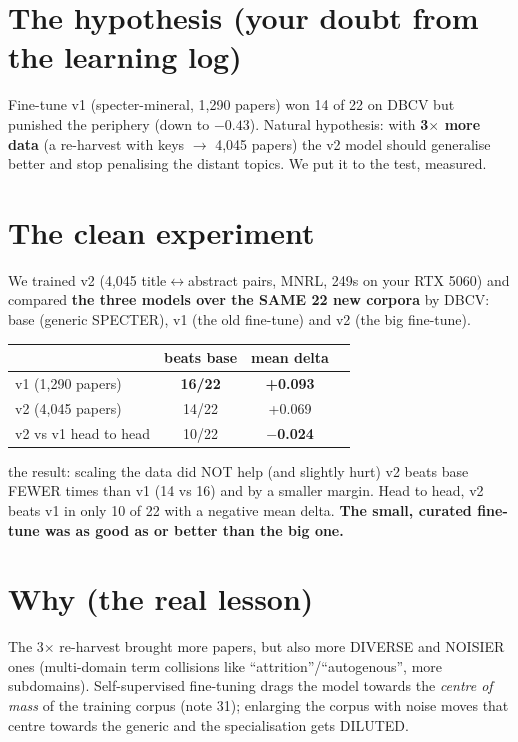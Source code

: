 \documentclass[11pt,a4paper]{article}
\begin{document}

\section{The hypothesis (your doubt from the learning log)}

Fine-tune v1 (specter-mineral, 1,290 papers) won 14 of 22 on DBCV but punished the periphery
(down to $-0.43$). Natural hypothesis: with \textbf{3$\times$ more data} (a re-harvest with
keys $\to$ 4,045 papers) the v2 model should generalise better and stop penalising the distant
topics. We put it to the test, measured.

\section{The clean experiment}

We trained v2 (4,045 title$\leftrightarrow$abstract pairs, MNRL, 249s on your RTX 5060) and
compared \textbf{the three models over the SAME 22 new corpora} by DBCV: base (generic
SPECTER), v1 (the old fine-tune) and v2 (the big fine-tune).

\begin{center}
\begin{tabular}{lccc}
 & beats base & mean delta \\
\hline
v1 (1,290 papers) & \textbf{16/22} & \textbf{+0.093} \\
v2 (4,045 papers) & 14/22 & +0.069 \\
v2 vs v1 head to head & 10/22 & \textbf{$-$0.024} \\
\end{tabular}
\end{center}

\begin{concepto}{the result: scaling the data did NOT help (and slightly hurt)}
v2 beats base FEWER times than v1 (14 vs 16) and by a smaller margin. Head to head, v2 beats v1
in only 10 of 22 with a negative mean delta. \textbf{The small, curated fine-tune was as good
as or better than the big one.}
\end{concepto}

\section{Why (the real lesson)}

The 3$\times$ re-harvest brought more papers, but also more DIVERSE and NOISIER ones
(multi-domain term collisions like ``attrition''/``autogenous'', more subdomains).
Self-supervised fine-tuning drags the model towards the \emph{centre of mass} of the training
corpus (note 31); enlarging the corpus with noise moves that centre towards the generic and the
specialisation gets DILUTED.
\end{document}
